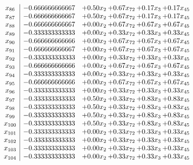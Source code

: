 \documentclass[8pt]{article}
\begin{document}
\[\begin{array}{c| c c@{\hskip 2pt} c@{\hskip 2pt} c@{\hskip 2pt} c@{\hskip 2pt} }
 x_{86}   &  -0.666666666667 & +  0.50 x_{2} & +  0.67 x_{72} & +  0.17 x_{3} & +  0.17 x_{45}\\
 x_{87}   &  -0.666666666667 & +  0.50 x_{2} & +  0.67 x_{72} & +  0.17 x_{3} & +  0.17 x_{45}\\
 x_{88}   &  -0.666666666667 & +  0.00 x_{2} & +  0.67 x_{72} & +  0.67 x_{3} & +  0.67 x_{45}\\
 x_{89}   &  -0.333333333333 & +  0.00 x_{2} & +  0.33 x_{72} & +  0.33 x_{3} & +  0.33 x_{45}\\
 x_{90}   &  -0.666666666666 & +  0.00 x_{2} & +  0.67 x_{72} & +  0.67 x_{3} & +  0.67 x_{45}\\
 x_{91}   &  -0.666666666667 & +  0.00 x_{2} & +  0.67 x_{72} & +  0.67 x_{3} & +  0.67 x_{45}\\
 x_{92}   &  -0.333333333333 & +  0.00 x_{2} & +  0.33 x_{72} & +  0.33 x_{3} & +  0.33 x_{45}\\
 x_{93}   &  -0.666666666666 & +  0.00 x_{2} & +  0.67 x_{72} & +  0.67 x_{3} & +  0.67 x_{45}\\
 x_{94}   &  -0.333333333333 & +  0.00 x_{2} & +  0.33 x_{72} & +  0.33 x_{3} & +  0.33 x_{45}\\
 x_{95}   &  -0.666666666666 & +  0.00 x_{2} & +  0.67 x_{72} & +  0.67 x_{3} & +  0.67 x_{45}\\
 x_{96}   &  -0.333333333333 & +  0.00 x_{2} & +  0.33 x_{72} & +  0.33 x_{3} & +  0.33 x_{45}\\
 x_{97}   &  -0.333333333333 & +  0.50 x_{2} & +  0.33 x_{72} & +  0.83 x_{3} & +  0.83 x_{45}\\
 x_{98}   &  -0.333333333333 & +  0.50 x_{2} & +  0.33 x_{72} & +  0.83 x_{3} & +  0.83 x_{45}\\
 x_{99}   &  -0.333333333333 & +  0.50 x_{2} & +  0.33 x_{72} & +  0.83 x_{3} & +  0.83 x_{45}\\
 x_{100}   &  -0.333333333333 & +  0.50 x_{2} & +  0.33 x_{72} & +  0.83 x_{3} & +  0.83 x_{45}\\
 x_{101}   &  -0.333333333333 & +  0.00 x_{2} & +  0.33 x_{72} & +  0.33 x_{3} & +  0.33 x_{45}\\
 x_{102}   &  -0.333333333333 & +  0.00 x_{2} & +  0.33 x_{72} & +  0.33 x_{3} & +  0.33 x_{45}\\
 x_{103}   &  -0.333333333333 & +  0.00 x_{2} & +  0.33 x_{72} & +  0.33 x_{3} & +  0.33 x_{45}\\
 x_{104}   &  -0.333333333333 & +  0.00 x_{2} & +  0.33 x_{72} & +  0.33 x_{3} & +  0.33 x_{45}\\

\end{array}\]
\end{document}
